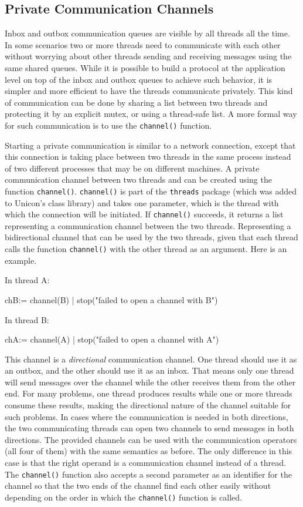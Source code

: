 \subsection{Private Communication Channels}
Inbox and outbox communication queues are visible by all threads all the
time. In some scenarios two or more threads need to communicate with each
other without worrying about other threads sending and receiving messages
using the same shared queues. While it is possible to build a protocol at
the application level on top of the inbox and outbox queues to achieve such
behavior, it is simpler and more efficient to have the threads communicate
privately.  This kind of communication can be done by sharing a list
between two threads and protecting it by an explicit mutex, or using a
thread-safe list. A more formal way for such communication is to use the
\texttt{channel()} function.

Starting a private communication is similar to a network connection, except
that this connection is taking place between two threads in the same
process instead of two different processes that may be on different
machines.  A private communication channel between two threads and can be
created using the function \texttt{channel()}. \texttt{channel()} is part
of the \texttt{threads} package (which was added to Unicon's class
library) and takes one parameter, which is the thread with which the
connection will be initiated.  If \texttt{channel()} succeeds, it returns a
list representing a communication channel between the two threads.
Representing a bidirectional channel that can be used by the two threads,
given that each thread calls the function \texttt{channel()} with the other
thread as an argument. Here is an example.

\noindent
In thread A:
\begin{iconcode}
  chB:= channel(B) | stop("failed to open a channel with B")
\end{iconcode}
In thread B:
\begin{iconcode}
  chA:= channel(A) | stop("failed to open a channel with A")
\end{iconcode}

\noindent
This channel is a {\em directional} communication channel.  One thread
should use it as an outbox, and the other should use it as an inbox.  That
means only one thread will send messages over the channel while the other
receives them from the other end. For many problems, one thread produces
results while one or more threads consume these results, making the
directional nature of the channel suitable for such problems.  In cases
where the communication is needed in both directions, the two communicating
threads can open two channels to send messages in both directions. The
provided channels can be used with the communication operators (all four of
them) with the same semantics as before.  The only difference in this case
is that the right operand is a communication channel instead of a
thread. The \texttt{channel()} function also accepts a second parameter as
an identifier for the channel so that the two ends of the channel find each
other easily without depending on the order in which the \texttt{channel()}
function is called.

